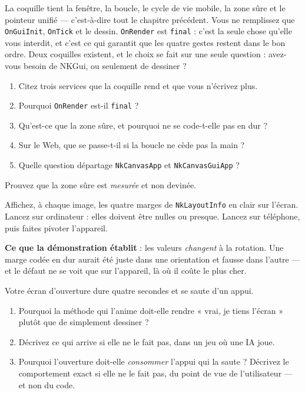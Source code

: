 \begin{nkbilan}
La coquille tient la fenêtre, la boucle, le cycle de vie mobile, la zone sûre et
le pointeur unifié --- c'est-à-dire tout le chapitre précédent. Vous ne
remplissez que \texttt{OnGuiInit}, \texttt{OnTick} et le dessin.
\texttt{OnRender} est \texttt{final} : c'est la seule chose qu'elle vous
interdit, et c'est ce qui garantit que les quatre gestes restent dans le bon
ordre. Deux coquilles existent, et le choix se fait sur une seule question :
avez-vous besoin de NKGui, ou seulement de dessiner ?
\end{nkbilan}

\begin{nkquestions}
\begin{enumerate}
\item Citez trois services que la coquille rend et que vous n'écrivez plus.
\item Pourquoi \texttt{OnRender} est-il \texttt{final} ?
\item Qu'est-ce que la zone sûre, et pourquoi ne se code-t-elle pas en dur ?
\item Sur le Web, que se passe-t-il si la boucle ne cède pas la main ?
\item Quelle question départage \texttt{NkCanvasApp} et \texttt{NkCanvasGuiApp} ?
\end{enumerate}
\end{nkquestions}

\begin{nkdemo}
Prouvez que la zone sûre est \emph{mesurée} et non devinée.

Affichez, à chaque image, les quatre marges de \texttt{NkLayoutInfo} en clair sur
l'écran. Lancez sur ordinateur : elles doivent être nulles ou presque. Lancez sur
téléphone, puis faites pivoter l'appareil.

\textbf{Ce que la démonstration établit} : les valeurs \emph{changent} à la
rotation. Une marge codée en dur aurait été juste dans une orientation et fausse
dans l'autre --- et le défaut ne se voit que sur l'appareil, là où il coûte le
plus cher.
\end{nkdemo}

\begin{nklogique}
Votre écran d'ouverture dure quatre secondes et se saute d'un appui.

\begin{enumerate}
\item Pourquoi la méthode qui l'anime doit-elle rendre « vrai, je tiens
      l'écran » plutôt que de simplement dessiner ?
\item Décrivez ce qui arrive si elle ne le fait pas, dans un jeu où une IA joue.
\item Pourquoi l'ouverture doit-elle \emph{consommer} l'appui qui la saute ?
      Décrivez le comportement exact si elle ne le fait pas, du point de vue de
      l'utilisateur --- et non du code.
\end{enumerate}
\end{nklogique}
